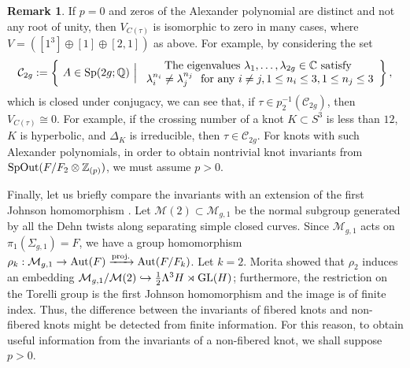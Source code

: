 \documentclass{article}
\theoremstyle{plain}
\theoremstyle{definition}
\newtheorem{rem}[thm]{Remark}
\newcommand{\ra}{\rightarrow}
\newcommand{\Q}{{\Bbb Q}}
\newcommand{\Z}{{\Bbb Z}}
\newcommand{\Aut}{{\rm Aut}}
\newcommand{\Sp}{{\rm Sp}}
\newcommand{\GL}{{\rm GL}}
\newcommand{\SpOut}{{\rm SpOut}}
\begin{document}
{\begin{rem}\label{iiiq}
If $p=0$ and zeros of the Alexander polynomial are distinct and not any root of unity, then $V_{C(\tau)} $ is isomorphic to zero in many cases, where $V= ([1^3] \oplus [1] \oplus [2,1])$ as above. For example, by considering the set
\begin{equation}\label{ppq}\mathcal{C}_{2g}:= \left\{ \ A \in \Sp( 2g;\Q) \ \Bigl|
\begin{array}{c}
\ \mathrm{The \ eigenvalues \ } \lambda_1,\dots, \lambda_{2g} \in \mathbb{C} \mathrm{ \ satisfy \ } \\ %
\ \lambda_{i}^{n_i} \neq \lambda_{j}^{n_j} \ \mathrm{ \ for \ any \ } i\neq j, 1 \leq n_i \leq 3 ,1 \leq n_j \leq 3
\end{array}
\right\}, \end{equation}
which is closed under conjugacy, we can see that, if $\tau \in p_2^{-1}( \mathcal{C}_{2g})$, then $V_{C(\tau)} \cong 0$. For example, if the crossing number of a knot $K \subset S^3$ is less than $12$, $K$ is hyperbolic, and $\Delta_K$ is irreducible, then $\tau \in \mathcal{C}_{2g}$. For knots with such Alexander polynomials, in order to obtain nontrivial knot invariants from $\SpOut(F/F_2 \otimes \Z_{(p)})$, we must assume $p > 0$.
\end{rem}

Finally, let us briefly compare the invariants with an extension of the first Johnson homomorphism \cite{Mo}. Let $ \mathcal{M}(2) \subset \mathcal{M}_{g,1} $ be the normal subgroup generated by all the Dehn twists along separating simple closed curves. Since $\mathcal{M}_{g,1} $ acts on $\pi_1( \Sigma_{g,1})=F$, we have a group homomorphism $\rho_k: \mathcal{M}_{g,1} \ra \Aut( F )\xrightarrow{\rm proj.}\Aut( F/F_k )$. Let $k=2$. Morita showed \cite[Theorem 4.8]{Mo} that $\rho_2$ induces an embedding $\mathcal{M}_{g,1} / \mathcal{M}(2) \hookrightarrow \frac{1}{2}\Lambda^3 H \rtimes \GL(H)$; furthermore, the restriction on the Torelli group is the first Johnson homomorphism and the image is of finite index. Thus, the difference between the invariants of fibered knots and non-fibered knots might be detected from finite information. For this reason, to obtain useful information from the invariants of a non-fibered knot, we shall suppose $p>0$.

}
\end{document}
